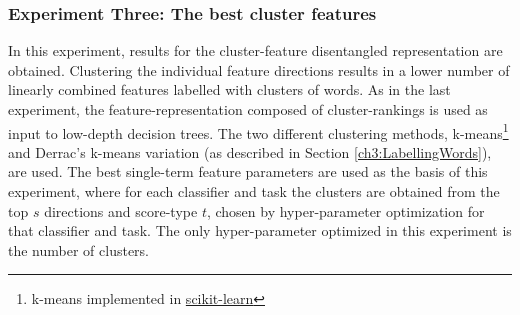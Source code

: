 \subsubsection{Experiment Three: The best cluster features}\label{ch3:ex3}

In this experiment, results for the cluster-feature disentangled representation are obtained. Clustering the individual feature directions  results in a lower number of linearly combined features labelled with clusters of words. As in the last experiment, the  feature-representation composed of cluster-rankings is used as input to low-depth decision trees.  The two different clustering methods,  k-means\footnote{k-means implemented in \href{https://scikit-learn.org/stable/modules/generated/sklearn.cluster.MiniBatchKMeans.html}{scikit-learn}} and Derrac's k-means variation (as described in Section \ref{ch3:LabellingWords}), are used. The best single-term feature parameters are used as the basis of this experiment, where for each classifier and task the clusters are obtained from the top $s$ directions and score-type $t$,  chosen by hyper-parameter optimization for that classifier and task. The only hyper-parameter optimized in this experiment is the number of clusters.






